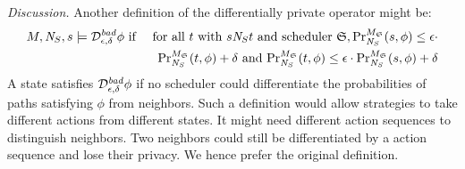 \noindent
\emph{Discussion.}
Another definition of the differentially private operator
might be: 
\begin{eqnarray*}
  M, \neighbor{S}, s \models \dpriv{\epsilon}{\delta}^{\mathit{bad}} \phi
  & \textmd{ if } &
  \textmd{for all } t \textmd{ with } s \neighbor{S} t \textmd{ and
  scheduler } \scheduler{S},
  \myPr{s}{M_{\scheduler{S}}}{\neighbor{S}}{\phi} \leq
  \epsilon \cdot\\
  && \myPr{t}{M_{\scheduler{S}}}{\neighbor{S}}{\phi} + \delta \textmd{ and }
  \myPr{t}{M_{\scheduler{S}}}{\neighbor{S}}{\phi} \leq
  \epsilon \cdot \myPr{s}{M_{\scheduler{S}}}{\neighbor{S}}{\phi} 
  + \delta
\end{eqnarray*}
A state satisfies $\dpriv{\epsilon}{\delta}^{\mathit{bad}} \phi$ if
no scheduler could differentiate the probabilities of paths satisfying
$\phi$ from neighbors. Such a definition would allow strategies to
take different actions from different states. It might need different
action sequences to distinguish neighbors. Two neighbors could still be
differentiated by a action sequence and lose their privacy. We hence
prefer the original definition.

